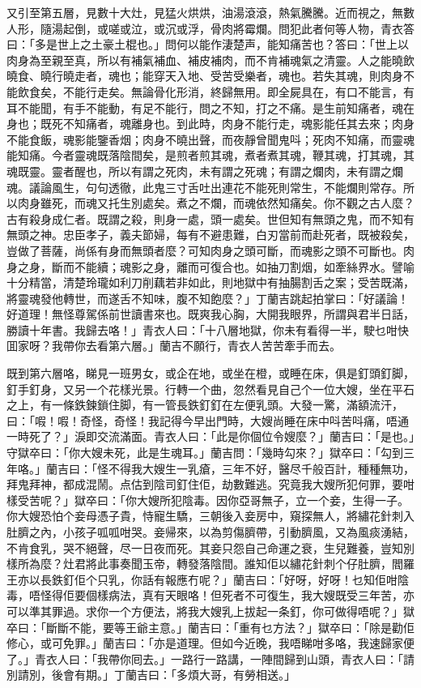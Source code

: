 \documentclass[a5paper, 12pt, openany]{book} %
\begin{document}
	又引至第五層，見數十大灶，見猛火烘烘，油湯滾滾，熱氣騰騰。近而視之，無數人形，隨湯起倒，或嗟或泣，或沉或浮，骨肉將霉爛。問犯此者何等人物，青衣答曰：「多是世上之土豪土棍也。」問何以能作淒楚声，能知痛苦也？答曰：「世上以肉身為至親至真，所以有補氣補血、補皮補肉，而不肯補魂氣之清靈。人之能曉飲曉食、曉行曉走者，魂也；能穿天入地、受苦受樂者，魂也。若失其魂，則肉身不能飲食矣，不能行走矣。無論骨化形消，終歸無用。即全屍具在，有口不能言，有耳不能聞，有手不能動，有足不能行，問之不知，打之不痛。是生前知痛者，魂在身也；既死不知痛者，魂離身也。到此時，肉身不能行走，魂影能任其去來；肉身不能食飯，魂影能鑒香烟；肉身不曉出聲，而夜靜曾聞鬼呌；死肉不知痛，而靈魂能知痛。今者靈魂既落陰間矣，是煎者煎其魂，煮者煮其魂，鞭其魂，打其魂，其魂既靈。靈者醒也，所以有謂之死肉，未有謂之死魂；有謂之爛肉，未有謂之爛魂。議論風生，句句透徹，此鬼三寸舌吐出連花不能死則常生，不能爛則常存。所以肉身雖死，而魂又托生別處矣。煮之不爛，而魂依然知痛矣。你不觀之古人麼？古有殺身成仁者。既謂之殺，則身一處，頭一處矣。世但知有無頭之鬼，而不知有無頭之神。忠臣孝子，義夫節婦，每有不避患難，白刃當前而赴死者，既被殺矣，豈做了菩薩，尚係有身而無頭者麼？可知肉身之頭可斷，而魂影之頭不可斷也。肉身之身，斷而不能續；魂影之身，離而可復合也。如抽刀割烟，如牽絲界水。譬喻十分精當，清楚玲瓏如利刀削藕若非如此，則地獄中有抽腸割舌之案；受苦既滿，將靈魂發他轉世，而遂舌不知味，腹不知飽麼？」丁蘭吉跳起拍掌曰：「好議論！好道理！無怪尊駕係前世讀書來也。既爽我心胸，大開我眼界，所謂與君半日話，勝讀十年書。我歸去咯！」青衣人曰：「十八層地獄，你未有看得一半，駛乜咁快囬家呀？我帶你去看第六層。」蘭吉不願行，青衣人苦苦牽手而去。

	既到第六層咯，睇見一班男女，或企在地，或坐在橙，或睡在床，俱是釘頭釘脚，釘手釘身，又另一个花樣光景。行轉一个曲，忽然看見自己个一位大嫂，坐在平石之上，有一條鉄鍊鎖住脚，有一管長鉄釘釘在左便乳頭。大發一驚，滿額流汗，曰：「㗇！㗇！奇怪，奇怪！我記得今早出門時，大嫂尚睡在床中呌苦呌痛，唔通一時死了？」淚即交流滿面。青衣人曰：「此是你個位令嫂麼？」蘭吉曰：「是也。」守獄卒曰：「你大嫂未死，此是生魂耳。」蘭吉問：「幾時勾來？」獄卒曰：「勾到三年咯。」蘭吉曰：「怪不得我大嫂生一乳瘡，三年不好，醫尽千般百計，種種無功，拜鬼拜神，都成混鬧。点估到陰司釘住佢，劫數難逃。究竟我大嫂所犯何罪，要咁樣受苦呢？」獄卒曰：「你大嫂所犯陰毒。因你亞哥無子，立一个妾，生得一子。你大嫂恐怕个妾母憑子貴，恃寵生驕，三朝後入妾房中，窺探無人，將繡花針刺入肚臍之內，小孩子呱呱咁哭。妾帰來，以為剪傷臍帶，引動臍風，又為風痰湧結，不肯食乳，哭不絕聲，尽一日夜而死。其妾只怨自己命運之衰，生兒難養，豈知別樣所為麼？灶君將此事奏聞玉帝，轉發落陰間。誰知佢以繡花針刺个仔肚臍，閻羅王亦以長鉄釘佢个只乳，你話有報應冇呢？」蘭吉曰：「好呀，好呀！乜知佢咁陰毒，唔怪得佢要個樣病法，真有天眼咯！但死者不可復生，我大嫂既受三年苦，亦可以準其罪過。求你一个方便法，將我大嫂乳上拔起一条釘，你可做得唔呢？」獄卒曰：「斷斷不能，要等王爺主意。」蘭吉曰：「重有乜方法？」獄卒曰：「除是勸佢修心，或可免罪。」蘭吉曰：「亦是道理。但如今近晚，我唔睇咁多咯，我速歸家便了。」青衣人曰：「我帶你囘去。」一路行一路講，一陣間歸到山頭，青衣人曰：「請別請別，後會有期。」丁蘭吉曰：「多煩大哥，有勞相送。」
\end{document}
